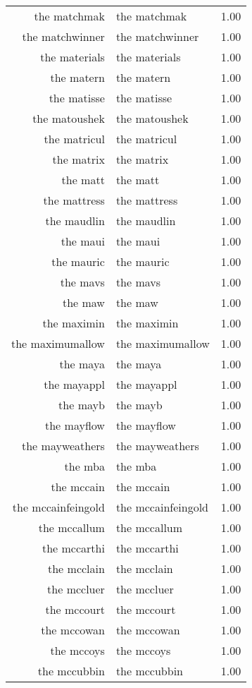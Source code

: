 \begin{table}[ht]
\begin{tabular}{rlr}
  the matchmak & the matchmak & 1.00 \\ 
  the matchwinner & the matchwinner & 1.00 \\ 
  the materials & the materials & 1.00 \\ 
  the matern & the matern & 1.00 \\ 
  the matisse & the matisse & 1.00 \\ 
  the matoushek & the matoushek & 1.00 \\ 
  the matricul & the matricul & 1.00 \\ 
  the matrix & the matrix & 1.00 \\ 
  the matt & the matt & 1.00 \\ 
  the mattress & the mattress & 1.00 \\ 
  the maudlin & the maudlin & 1.00 \\ 
  the maui & the maui & 1.00 \\ 
  the mauric & the mauric & 1.00 \\ 
  the mavs & the mavs & 1.00 \\ 
  the maw & the maw & 1.00 \\ 
  the maximin & the maximin & 1.00 \\ 
  the maximumallow & the maximumallow & 1.00 \\ 
  the maya & the maya & 1.00 \\ 
  the mayappl & the mayappl & 1.00 \\ 
  the mayb & the mayb & 1.00 \\ 
  the mayflow & the mayflow & 1.00 \\ 
  the mayweathers & the mayweathers & 1.00 \\ 
  the mba & the mba & 1.00 \\ 
  the mccain & the mccain & 1.00 \\ 
  the mccainfeingold & the mccainfeingold & 1.00 \\ 
  the mccallum & the mccallum & 1.00 \\ 
  the mccarthi & the mccarthi & 1.00 \\ 
  the mcclain & the mcclain & 1.00 \\ 
  the mccluer & the mccluer & 1.00 \\ 
  the mccourt & the mccourt & 1.00 \\ 
  the mccowan & the mccowan & 1.00 \\ 
  the mccoys & the mccoys & 1.00 \\ 
  the mccubbin & the mccubbin & 1.00 \\ 

\end{tabular}
\end{table}
